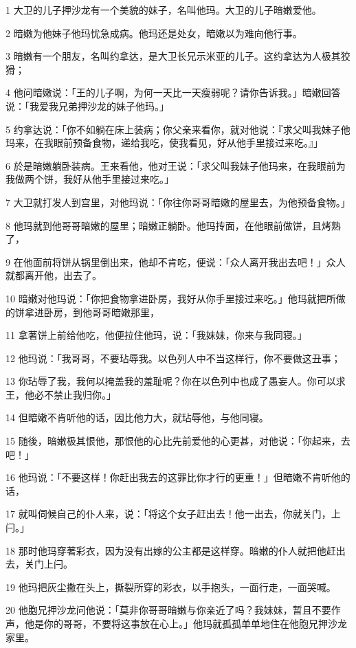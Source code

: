 \par 1 大卫的儿子押沙龙有一个美貌的妹子，名叫他玛。大卫的儿子暗嫩爱他。
\par 2 暗嫩为他妹子他玛忧急成病。他玛还是处女，暗嫩以为难向他行事。
\par 3 暗嫩有一个朋友，名叫约拿达，是大卫长兄示米亚的儿子。这约拿达为人极其狡猾；
\par 4 他问暗嫩说：「王的儿子啊，为何一天比一天瘦弱呢？请你告诉我。」暗嫩回答说：「我爱我兄弟押沙龙的妹子他玛。」
\par 5 约拿达说：「你不如躺在床上装病；你父亲来看你，就对他说：『求父叫我妹子他玛来，在我眼前预备食物，递给我吃，使我看见，好从他手里接过来吃。』」
\par 6 於是暗嫩躺卧装病。王来看他，他对王说：「求父叫我妹子他玛来，在我眼前为我做两个饼，我好从他手里接过来吃。」
\par 7 大卫就打发人到宫里，对他玛说：「你往你哥哥暗嫩的屋里去，为他预备食物。」
\par 8 他玛就到他哥哥暗嫩的屋里；暗嫩正躺卧。他玛抟面，在他眼前做饼，且烤熟了，
\par 9 在他面前将饼从锅里倒出来，他却不肯吃，便说：「众人离开我出去吧！」众人就都离开他，出去了。
\par 10 暗嫩对他玛说：「你把食物拿进卧房，我好从你手里接过来吃。」他玛就把所做的饼拿进卧房，到他哥哥暗嫩那里，
\par 11 拿著饼上前给他吃，他便拉住他玛，说：「我妹妹，你来与我同寝。」
\par 12 他玛说：「我哥哥，不要玷辱我。以色列人中不当这样行，你不要做这丑事；
\par 13 你玷辱了我，我何以掩盖我的羞耻呢？你在以色列中也成了愚妄人。你可以求王，他必不禁止我归你。」
\par 14 但暗嫩不肯听他的话，因比他力大，就玷辱他，与他同寝。
\par 15 随後，暗嫩极其恨他，那恨他的心比先前爱他的心更甚，对他说：「你起来，去吧！」
\par 16 他玛说：「不要这样！你赶出我去的这罪比你才行的更重！」但暗嫩不肯听他的话，
\par 17 就叫伺候自己的仆人来，说：「将这个女子赶出去！他一出去，你就关门，上闩。」
\par 18 那时他玛穿著彩衣，因为没有出嫁的公主都是这样穿。暗嫩的仆人就把他赶出去，关门上闩。
\par 19 他玛把灰尘撒在头上，撕裂所穿的彩衣，以手抱头，一面行走，一面哭喊。
\par 20 他胞兄押沙龙问他说：「莫非你哥哥暗嫩与你亲近了吗？我妹妹，暂且不要作声，他是你的哥哥，不要将这事放在心上。」他玛就孤孤单单地住在他胞兄押沙龙家里。
